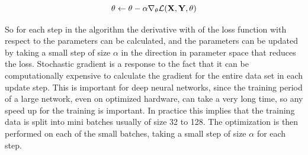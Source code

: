 \begin{equation}
    \theta \leftarrow \theta - \alpha \nabla_{\theta} \mathcal{L}(\textbf{X}, \textbf{Y}, \theta)
\end{equation}

So for each step in the algorithm the derivative with of the loss function with respect to the parameters can be calculated, and the parameters can be updated by taking a small step of size $\alpha$ in the direction in parameter space that reduces the loss. Stochastic gradient is a response to the fact that it can be computationally expensive to calculate the gradient for the entire data set in each update step. This is important for deep neural networks, since the training period of a large network, even on optimized hardware, can take a very long time, so any speed up for the training is important. In practice this implies that the training data is split into mini batches usually of size 32 to 128. The optimization is then performed on each of the small batches, taking a small step of size $\alpha$ for each step.


